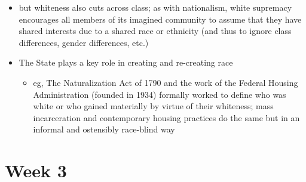 \documentclass[12pt]{article}
\begin{document}
\begin{itemize}
\begin{itemize}
                    \item but whiteness also cuts across class; as with nationalism, white supremacy encourages all members of its imagined community to assume that they have shared interests due to a shared race or ethnicity (and thus to ignore class differences, gender differences, etc.)
                    \item The State plays a key role in creating and re-creating race
                    \begin{itemize}
                        \item eg, The Naturalization Act of 1790 and the work of the Federal Housing Administration (founded in 1934) formally worked to define who was white or who gained materially by virtue of their whiteness; mass incarceration and contemporary housing practices do the same but in an informal and ostensibly race-blind way
                    \end{itemize}
                \end{itemize}
            \end{itemize}
            \newpage

    \section{Week 3}
\end{document}
